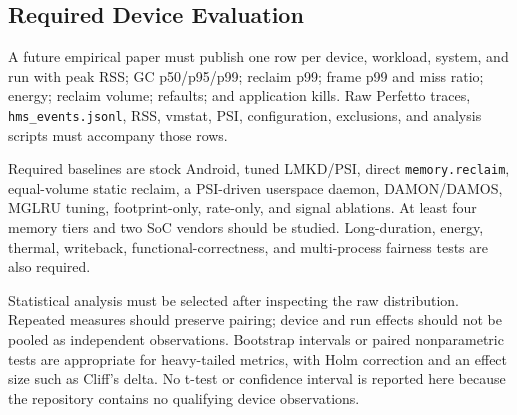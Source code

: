 \subsection{Required Device Evaluation}
A future empirical paper must publish one row per device, workload, system, and run
with peak RSS; GC p50/p95/p99; reclaim p99; frame p99 and miss ratio; energy;
reclaim volume; refaults; and application kills.  Raw Perfetto traces,
\texttt{hms\_events.jsonl}, RSS, vmstat, PSI, configuration, exclusions, and analysis
scripts must accompany those rows.

Required baselines are stock Android, tuned LMKD/PSI, direct
\texttt{memory.reclaim}, equal-volume static reclaim, a PSI-driven userspace
daemon, DAMON/DAMOS, MGLRU tuning, footprint-only, rate-only, and signal ablations.
At least four memory tiers and two SoC vendors should be studied.  Long-duration,
energy, thermal, writeback, functional-correctness, and multi-process fairness
tests are also required.

Statistical analysis must be selected after inspecting the raw distribution.
Repeated measures should preserve pairing; device and run effects should not be
pooled as independent observations.  Bootstrap intervals or paired nonparametric
tests are appropriate for heavy-tailed metrics, with Holm correction and an effect
size such as Cliff's delta.  No t-test or confidence interval is reported here
because the repository contains no qualifying device observations.
